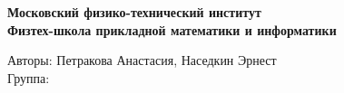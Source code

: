 \begin{titlepage}
	\clearpage\thispagestyle{empty}
	\centering
	
	\textbf{Московский физико-технический институт \\ Физтех-школа прикладной математики и информатики}
	\vspace{33ex}
	
	{\textbf{\FullCourseNameFirstPart}}
	
	\vfill
	\vspace{1ex}
	
	\begin{flushright}
		\noindent
		Авторы: Петракова Анастасия, Наседкин Эрнест\\
        Группа: \Group
	\end{flushright}
	
	\CourseDate
	\pagebreak
\end{titlepage}